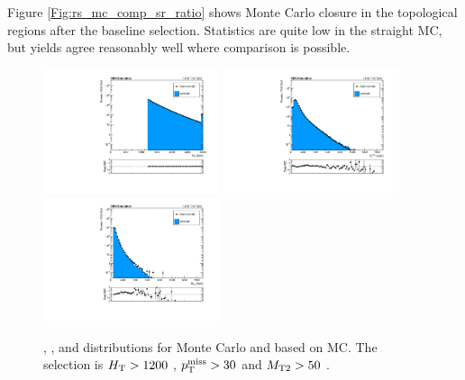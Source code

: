 Figure \ref{Fig:rs_mc_comp_sr_ratio} shows Monte Carlo closure in the topological regions after the baseline selection.
Statistics are quite low in the straight MC, but yields agree reasonably well where comparison is possible.

\begin{figure}[htbp]
  \begin{center}
    \includegraphics[width=0.46\textwidth]{figs/qcd/rs_mc/highht_ht.pdf}
    \includegraphics[width=0.46\textwidth]{figs/qcd/rs_mc/highht_met.pdf} \\
    \includegraphics[width=0.46\textwidth]{figs/qcd/rs_mc/highht_mt2.pdf}
    \caption{\Ht, \ptmiss, and \mttwo distributions for Monte Carlo and \rs based on MC. The selection is $H_{\mathrm{T}} > 1200$ \GeV, $p_{\mathrm{T}}^{\mathrm{miss}} > 30$ \GeV and $M_{\mathrm{T2}} > 50$ \GeV.
            }
    \label{Fig:rs_mc_ht_met_highht}
  \end{center}
\end{figure}

